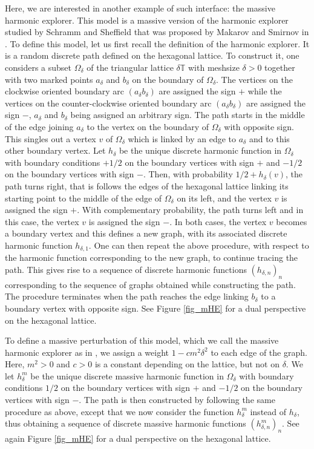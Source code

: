 \documentclass{article}
\theoremstyle{definition}
\theoremstyle{remark}
\theoremstyle{remark}
\begin{document}
Here, we are interested in another example of such interface: the massive harmonic explorer. This model is a massive version of the harmonic explorer studied by Schramm and Sheffield \cite{HE} that was proposed by Makarov and Smirnov in \cite{off_SLE}. To define this model, let us first recall the definition of the harmonic explorer. It is a random discrete path defined on the hexagonal lattice. To construct it, one considers a subset $\Omega_{\delta}$ of the triangular lattice $\delta \mathbb{T}$ with meshsize $\delta > 0$ together with two marked points $a_{\delta}$ and $b_{\delta}$ on the boundary of $\Omega_{\delta}$. The vertices on the clockwise oriented boundary arc $(a_{\delta}b_{\delta})$ are assigned the sign $+$ while the vertices on the counter-clockwise oriented boundary arc $(a_{\delta}b_{\delta})$ are assigned the sign $-$, $a_{\delta}$ and $b_{\delta}$ being assigned an arbitrary sign. The path starts in the middle of the edge joining $a_{\delta}$ to the vertex on the boundary of $\Omega_{\delta}$ with opposite sign. This singles out a vertex $v$ of $\Omega_{\delta}$ which is linked by an edge to $a_{\delta}$ and to this other boundary vertex. Let $h_{\delta}$ be the unique discrete harmonic function in $\Omega_{\delta}$ with boundary conditions $+1/2$ on the boundary vertices with sign $+$ and  $-1/2$ on the boundary vertices with sign $-$. Then, with probability $1/2+h_{\delta}(v)$, the path turns right, that is follows the edges of the hexagonal lattice linking its starting point to the middle of the edge of $\Omega_{\delta}$ on its left, and the vertex $v$ is assigned the sign $+$. With complementary probability, the path turns left and in this case, the vertex $v$ is assigned the sign $-$. In both cases, the vertex $v$ becomes a boundary vertex and this defines a new graph, with its associated discrete harmonic function $h_{\delta,1}$. One can then repeat the above procedure, with respect to the harmonic function corresponding to the new graph, to continue tracing the path. This gives rise to a sequence of discrete harmonic functions $(h_{\delta, n})_n$ corresponding to the sequence of graphs obtained while constructing the path. The procedure terminates when the path reaches the edge linking $b_{\delta}$ to a boundary vertex with opposite sign. See Figure \ref{fig_mHE} for a dual perspective on the hexagonal lattice.

To define a massive perturbation of this model, which we call the massive harmonic explorer as in \cite{off_SLE}, we assign a weight $1-cm^2\delta^2$ to each edge of the graph. Here, $m^2>0$ and $c>0$ is a constant depending on the lattice, but not on $\delta$. We let $h_{\delta}^{m}$ be the unique discrete massive harmonic function in $\Omega_{\delta}$ with boundary conditions $1/2$ on the boundary vertices with sign $+$ and $-1/2$ on the boundary vertices with sign $-$. The path is then constructed by following the same procedure as above, except that we now consider the function $h_{\delta}^m$ instead of $h_{\delta}$, thus obtaining a sequence of discrete massive harmonic functions $(h_{\delta,n}^m)_n$. See again Figure \ref{fig_mHE} for a dual perspective on the hexagonal lattice.
\end{document}
